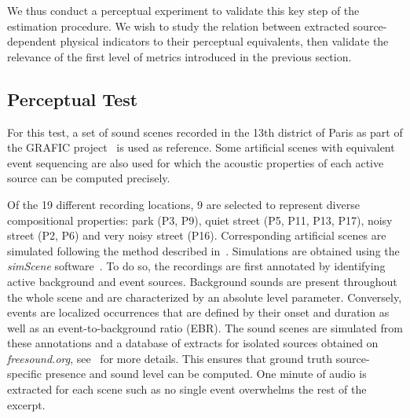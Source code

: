 \documentclass{article}
\begin{document}
\begin{sloppy}
We thus conduct a perceptual experiment to validate this key step of the estimation procedure. We wish to study the relation between extracted source-dependent physical indicators to their perceptual equivalents, then validate the relevance of the first level of metrics introduced in the previous section.

\subsection{Perceptual Test}
\label{sec:test}

For this test, a set of sound scenes recorded in the 13th district of Paris as part of the GRAFIC project~\cite{aumond2017} is used as reference. Some artificial scenes with equivalent event sequencing are also used for which the acoustic properties of each active source can be computed precisely.

Of the 19 different recording locations, 9 are selected to represent diverse compositional properties: park (P3, P9), quiet street (P5, P11, P13, P17), noisy street (P2, P6) and very noisy street (P16). Corresponding artificial scenes are simulated following the method described in~\cite{gloaguen2017}. Simulations are obtained using the \textit{simScene} software~\cite{lafay2016}. To do so, the recordings are first annotated by identifying active background and event sources. Background sounds are present throughout the whole scene and are characterized by an absolute level parameter. Conversely, events are localized occurrences that are defined by their onset and duration as well as an event-to-background ratio (EBR). The sound scenes are simulated from these annotations and a database of extracts for isolated sources obtained on \textit{freesound.org}, see~\cite{gloaguen2017} for more details. This ensures that ground truth source-specific presence and sound level can be computed. One minute of audio is extracted for each scene such as no single event overwhelms the rest of the excerpt.


\end{sloppy}
\end{document}

